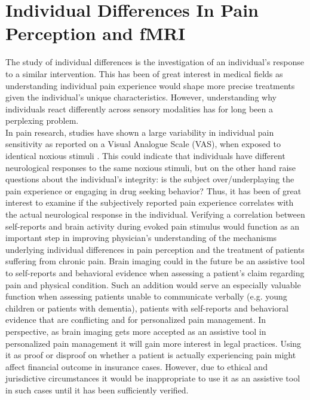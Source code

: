 \section{Individual Differences In Pain Perception and fMRI}
The study of individual differences is the investigation of an individual’s response to a similar intervention. This has been of great interest in medical fields as understanding individual pain experience would shape more precise treatments given the individual’s unique characteristics. However, understanding why individuals react differently across sensory modalities has for long been a perplexing problem. \\
In pain research, studies have shown a large variability in individual pain sensitivity as reported on a Visual Analogue Scale (VAS), when exposed to identical noxious stimuli \cite{Nielsen2008, Coghill2003}. This could indicate that individuals have different neurological responses to the same noxious stimuli, but on the other hand raise questions about the individual's integrity: is the subject over/underplaying the pain experience or engaging in drug seeking behavior? Thus, it has been of great interest to examine if the subjectively reported pain experience correlates with the actual neurological response in the individual. \cite{Coghill2011} Verifying a correlation between self-reports and brain activity during evoked pain stimulus would function as an important step in improving physician’s understanding of the mechanisms underlying individual differences in pain perception and the treatment of patients suffering from chronic pain. Brain imaging could in the future be an assistive tool to self-reports and behavioral evidence when assessing a patient’s claim regarding pain and physical condition. Such an addition would serve an especially valuable function when assessing patients unable to communicate verbally (e.g. young children or patients with dementia), patients with self-reports and behavioral evidence that are conflicting and for personalized pain management. In perspective, as brain imaging gets more accepted as an assistive tool in personalized pain management it will gain more interest in legal practices. Using it as proof or disproof on whether a patient is actually experiencing pain might affect financial outcome in insurance cases. However, due to ethical and jurisdictive circumstances it would be inappropriate to use it as an assistive tool in such cases until it has been sufficiently verified. \cite{Davis2017} \\
